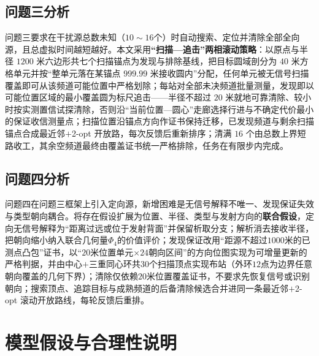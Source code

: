 \documentclass[withoutpreface]{cumcmthesis}
\begin{document}
\subsection{问题三分析}

问题三要求在干扰源总数未知（$10\sim16$个）时自动搜索、定位并清除全部全向源，且总虚拟时间越短越好。本文采用\textbf{“扫描—追击”两相滚动策略}：以原点与半径 $1200$ 米六边形共七个扫描锚点为发现与排除基线，把目标圆域剖分为 $40$ 米方格单元并按“整单元落在某锚点 $999.99$ 米接收圆内”分配，任何单元被无信号扫描覆盖即可从该频道可能位置中严格划除；每站对全部未决频道批量测量，发现即以可能位置区域的最小覆盖圆为标尺追击——半径不超过 $20$ 米就地可靠清除、较小时按实测置信试探清除，否则沿“当前位置—圆心”走廊选择行进与不确定代价最小的保证收信测量点；扫描位置沿锚点方向作证书保持迁移，已发现频道与剩余扫描锚点合成最近邻$+$2-opt 开放路，每次反馈后重新排序；清满 $16$ 个由总数上界短路收工，其余空频道最终由覆盖证书统一严格排除，任务在有限步内完成。

\subsection{问题四分析}

问题四在问题三框架上引入定向源，新增困难是无信号解释不唯一、发现保证失效与类型朝向耦合。将存在假设扩展为位置、半径、类型与发射方向的\textbf{联合假设}，定向无信号解释为“距离过远或位于发射背面”并保留析取分支；解析消去接收半径，把朝向缩小纳入联合几何量$\Phi_4$的价值评价；发现保证改用“距源不超过$1000$米的已测点凸包”证书，以“$20$米位置单元$\times24$朝向区间”的方向位图实现为可增量更新的严格判据，并由中心$+$三重同心环共$30$个扫描顶点实现布站（外环$12$点为边界任意朝向覆盖的几何下界）；清除仅依赖$20$米位置覆盖证书，不要求先恢复信号或识别朝向；搜索顶点、追踪目标与成熟频道的后备清除候选合并进同一条最近邻$+$2-opt 滚动开放路线，每轮反馈后重排。

\section{模型假设与合理性说明}
\end{document}
